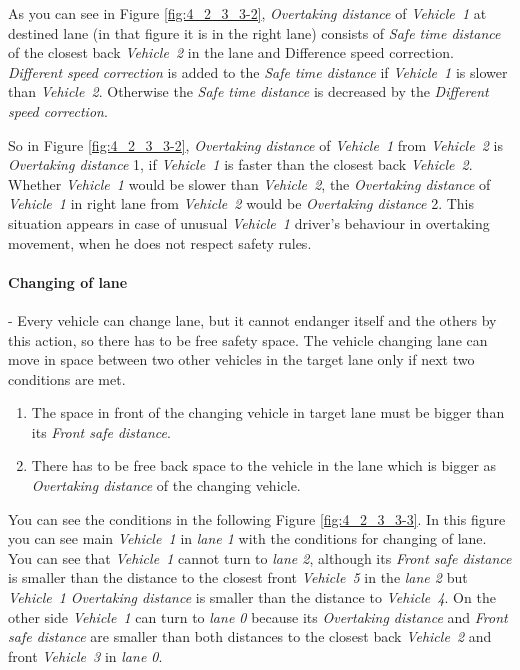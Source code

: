 As you can see in Figure \ref{fig:4_2_3_3-2}, \textit{Overtaking distance} of \textit{\mbox{Vehicle 1}} at destined lane (in that figure it is in the right lane) consists of \textit{Safe time distance} of the closest back \textit{\mbox{Vehicle 2}} in the lane and Difference speed correction. \textit{Different speed correction} is added to the \textit{Safe time distance} if \textit{\mbox{Vehicle 1}} is slower than \textit{\mbox{Vehicle 2}}. Otherwise the \textit{Safe time distance} is decreased by the \textit{Different speed correction}. 

So in Figure \ref{fig:4_2_3_3-2}, \textit{Overtaking distance} of \textit{\mbox{Vehicle 1}} from \textit{\mbox{Vehicle 2}} is \textit{Overtaking distance} 1, if \textit{\mbox{Vehicle 1}} is faster than the closest back \textit{\mbox{Vehicle 2}}. Whether \textit{\mbox{Vehicle 1}} would be slower than \textit{\mbox{Vehicle 2}}, the \textit{Overtaking distance} of \textit{\mbox{Vehicle 1}} in right lane from \textit{\mbox{Vehicle 2}} would be \textit{Overtaking distance} 2. This situation appears in case of unusual \textit{\mbox{Vehicle 1}} driver’s behaviour in overtaking movement, when he does not respect safety rules.

\paragraph{Changing of lane}

- Every vehicle can change lane, but it cannot endanger itself and the others by this action, so there has to be free safety space. The vehicle changing lane can move in space between two other vehicles in the target lane only if next two conditions are met.

\begin{enumerate}
\item The space in front of the changing vehicle in target lane must be bigger than its \textit{Front safe distance}.
\item There has to be free back space to the vehicle in the lane which is bigger as \textit{Overtaking distance} of the changing vehicle.
\end{enumerate}

You can see the conditions in the following Figure \ref{fig:4_2_3_3-3}. In this figure you can see main \textit{\mbox{Vehicle 1}} in \textit{lane 1} with the conditions for changing of lane. You can see that \textit{\mbox{Vehicle 1}} cannot turn to \textit{lane 2}, although its \textit{Front safe distance} is smaller than the distance to the closest front \textit{\mbox{Vehicle 5}} in the \textit{lane 2}  but  \textit{\mbox{Vehicle 1}} \textit{Overtaking distance} is smaller than the distance to \textit{\mbox{Vehicle 4}}. On the other side \textit{\mbox{Vehicle 1}} can turn to \textit{lane 0} because its \textit{Overtaking distance} and \textit{Front safe distance} are smaller than both distances to the closest back \textit{\mbox{Vehicle 2}} and front \textit{\mbox{Vehicle 3}} in \textit{lane 0}.

